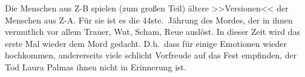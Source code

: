 Die Menschen aus Z-B spielen (zum großen Teil) ältere >>Versionen<< der Menschen
aus Z-A. Für sie ist es die 44ste.~Jährung des Mordes, der in ihnen vermutlich
vor allem Trauer, Wut, Scham, Reue auslöst.
In dieser Zeit wird das erste Mal wieder dem Mord gedacht. D.h.~dass für einige
Emotionen wieder hochkommen, andererseits viele schlicht Vorfreude auf das Fest
empfinden, der Tod Laura Palmas ihnen nicht in Erinnerung ist.
